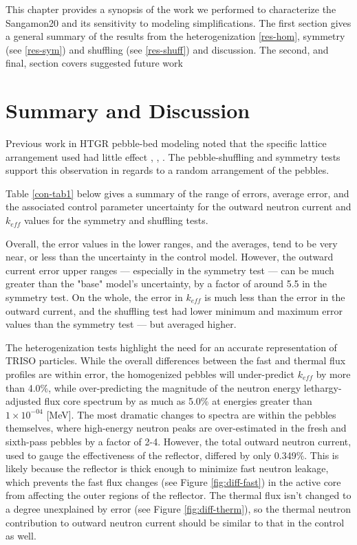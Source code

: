This chapter provides a synopsis of the work we performed to characterize the Sangamon20 and its sensitivity to modeling simplifications.  The first section gives a general summary of the results from the heterogenization \autoref{res-hom}, symmetry (see \autoref{res-sym}) and shuffling (see \autoref{res-shuff}) and discussion.  The second, and final, section covers suggested future work

\section{Summary and Discussion}

Previous work in HTGR pebble-bed modeling noted that the specific lattice arrangement used had little effect \cite{turkmen_effect_2012}, \cite{karriem_mcnp_2001}, \cite{brown_stochastic_2005}.  The pebble-shuffling and symmetry tests support this observation in regards to a  random arrangement of the pebbles.

Table \ref{con-tab1} below gives a summary of the range of errors, average error, and the associated control parameter uncertainty for the outward neutron current and $k_{eff}$ values for the symmetry and shuffling tests.



Overall, the error values in the lower ranges, and the averages, tend to be very near, or less than  the uncertainty in the control model.  However, the outward current error upper ranges --- especially in the symmetry test --- can be much greater than the "base" model's uncertainty, by a factor of around 5.5 in the symmetry test.  On the whole, the error in $k_{eff}$ is much less than the error in the outward current, and the shuffling test had lower minimum and maximum error values than the symmetry test --- but averaged higher.

The heterogenization tests highlight the need for an accurate representation of TRISO particles.  While the overall differences between the fast and thermal flux profiles are within error, the homogenized pebbles will under-predict $k_{eff}$ by more than 4.0\%, while over-predicting the magnitude of the neutron energy lethargy-adjusted flux core spectrum by as much as 5.0\% at energies greater than $1 \times 10^{-04}$ [MeV].  The most dramatic changes to spectra are within the pebbles themselves, where high-energy neutron peaks are over-estimated in the fresh and sixth-pass pebbles by a factor of 2-4.  However, the total outward neutron current, used to gauge the effectiveness of the reflector, differed by only 0.349\%.  This is likely because the reflector is thick enough to minimize fast neutron leakage, which prevents the fast flux changes (see Figure \ref{fig:diff-fast}) in the active core from affecting the outer regions of the reflector. The thermal flux isn't changed to a degree unexplained by error (see Figure \ref{fig:diff-therm}), so the thermal neutron contribution to outward neutron current should be similar to that in the control as well.

